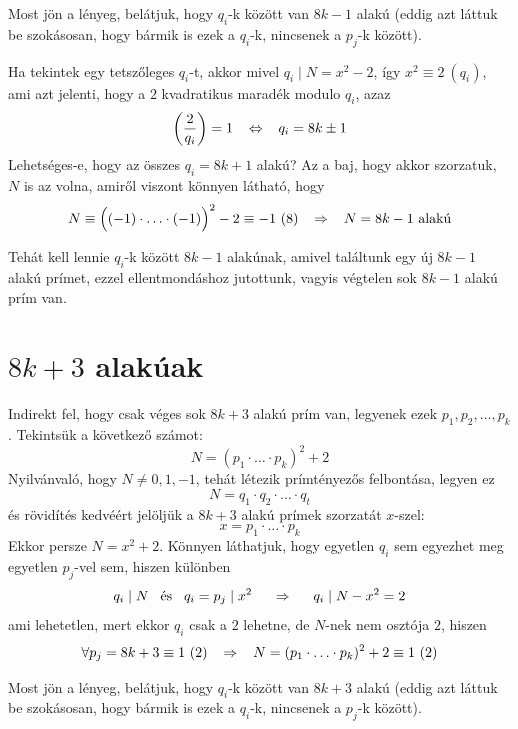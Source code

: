 \documentclass[12pt]{book}
\theoremstyle{plain} %
\theoremstyle{definition} %
\theoremstyle{remark}
\numberwithin{equation}{section}  %
\begin{document}
	Most jön a lényeg, belátjuk, hogy $q_i$-k között van $8k-1$ alakú (eddig azt láttuk be szokásosan, hogy bármik is ezek a $q_i$-k, nincsenek a $p_j$-k között).
	
	Ha tekintek egy tetszőleges $q_i$-t, akkor mivel $q_i\mid N = x^2-2$, így $x^2\equiv 2\ (q_i)$, ami azt jelenti, hogy a $2$ kvadratikus maradék modulo $q_i$, azaz
	\[ \left( \dfrac{2}{q_i} \right) = 1 \hspace{3mm} \Leftrightarrow \hspace{3mm} q_i = 8k\pm 1 \]
	Lehetséges-e, hogy az összes $q_i=8k+1$ alakú? Az a baj, hogy akkor szorzatuk, $N$ is az volna, amiről viszont könnyen látható, hogy
	\[ N \equiv \Big((-1)\cdot \ldots \cdot (-1)\Big)^2 - 2 \equiv -1  \ (8) \hspace{3mm} \Rightarrow \hspace{3mm} N=8k-1 \text{ alakú}  \]
	
	Tehát kell lennie $q_i$-k között $8k-1$ alakúnak, amivel találtunk egy új $8k-1$ alakú prímet, ezzel ellentmondáshoz jutottunk, vagyis végtelen sok $8k-1$ alakú prím van.
	
	\section{$8k+3$ alakúak}
	
	Indirekt fel, hogy csak véges sok $8k+3$ alakú prím van, legyenek ezek $p_1,p_2,\ldots,p_k$. Tekintsük a következő számot:
	\[ N = (p_1\cdot \ldots \cdot p_k)^{2} + 2  \]
	Nyilvánvaló, hogy $N\neq 0,1,-1$, tehát létezik prímtényezős felbontása, legyen ez
	\[ N = q_1\cdot q_2\cdot \ldots \cdot q_t  \]
	és rövidítés kedvéért jelöljük a $8k+3$ alakú prímek szorzatát $x$-szel:
	\[ x = p_1\cdot \ldots \cdot p_k   \]
	Ekkor persze $N=x^{2}+2$. Könnyen láthatjuk, hogy egyetlen $q_i$ sem egyezhet meg egyetlen $p_j$-vel sem, hiszen különben
	\[ q_i \mid N \hspace{3mm} \text{és} \hspace{3mm} q_i=p_j\mid x^{2} \hspace{5mm} \Rightarrow \hspace{5mm} q_i\mid N-x^{2}=2  \]
	ami lehetetlen, mert ekkor $q_i$ csak a $2$ lehetne, de $N$-nek nem osztója $2$, hiszen
	\[ \forall p_j = 8k+3 \equiv 1\ (2) \hspace{3mm} \Rightarrow \hspace{3mm} N = (p_1\cdot \ldots \cdot p_k)^2 + 2 \equiv 1\ (2)  \]
	
	Most jön a lényeg, belátjuk, hogy $q_i$-k között van $8k+3$ alakú (eddig azt láttuk be szokásosan, hogy bármik is ezek a $q_i$-k, nincsenek a $p_j$-k között).
	
\end{document}
